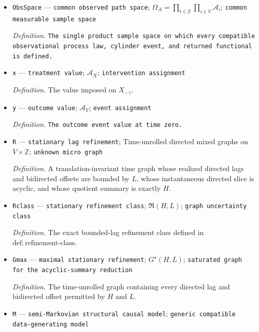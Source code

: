 \documentclass{article}
\begin{document}
\begin{itemize}
  \par\smallskip\noindent\emph{Definition.} A fixed common input: each \(\mathcal A_i\) is one specified set, and every compatible model uses exactly this family; finiteness and nontriviality are imposed by \(\mathrm{ass:finite\text{-}alphabet}\).
  \item \texttt{ObsSpace} --- \texttt{common observed path space}; \(\Omega_{\mathcal A}=\prod_{t\in\mathbb Z}\prod_{i\in V}\mathcal A_i\); \texttt{common measurable sample space}
  \par\smallskip\noindent\emph{Definition.} \texttt{The single product sample space on which every compatible observational process law,\allowbreak{} cylinder event,\allowbreak{} and returned functional is defined.}
  \item \texttt{x} --- \texttt{treatment value}; \(\mathcal A_X\); \texttt{intervention assignment}
  \par\smallskip\noindent\emph{Definition.} The value imposed on \(X_{-\gamma}\).
  \item \texttt{y} --- \texttt{outcome value}; \(\mathcal A_Y\); \texttt{event assignment}
  \par\smallskip\noindent\emph{Definition.} \texttt{The outcome event value at time zero.}
  \item \texttt{R} --- \texttt{stationary lag refinement}; Time-unrolled directed mixed graphs on \(V\times\mathbb Z\); \texttt{unknown micro graph}
  \par\smallskip\noindent\emph{Definition.} A translation-invariant time graph whose realized directed lags and bidirected offsets are bounded by \(L\), whose instantaneous directed slice is acyclic, and whose quotient summary is exactly \(H\).
  \item \texttt{Rclass} --- \texttt{stationary refinement class}; \(\mathfrak R(H,L)\); \texttt{graph uncertainty class}
  \par\smallskip\noindent\emph{Definition.} The exact bounded-lag refinement class defined in \(\mathrm{def:refinement\text{-}class}\).
  \item \texttt{Gmax} --- \texttt{maximal stationary refinement}; \(G^\star(H,L)\); \texttt{saturated graph for the acyclic-\allowbreak{}summary reduction}
  \par\smallskip\noindent\emph{Definition.} The time-unrolled graph containing every directed lag and bidirected offset permitted by \(H\) and \(L\).
  \item \texttt{M} --- \texttt{semi-\allowbreak{}Markovian structural causal model}; \texttt{generic compatible data-\allowbreak{}generating model}

\end{itemize}
\end{document}
